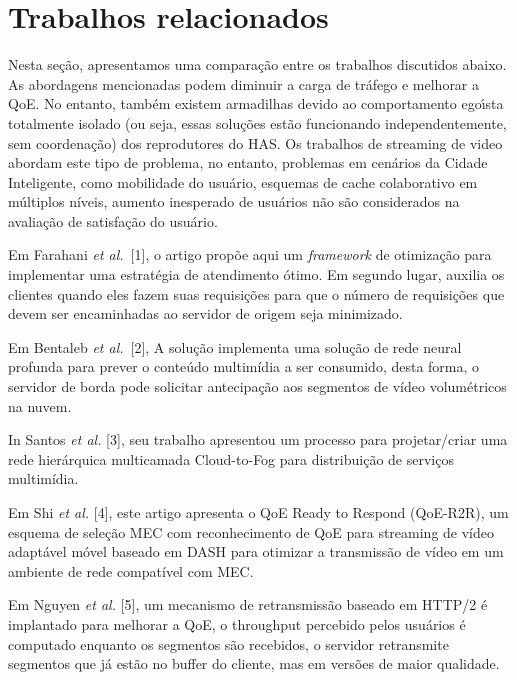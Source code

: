 \section{Trabalhos relacionados}

Nesta seção, apresentamos uma comparação entre os trabalhos discutidos abaixo.
As abordagens mencionadas podem diminuir a carga de tráfego e melhorar a QoE.
No entanto, também existem armadilhas devido ao comportamento egoı́sta totalmente isolado (ou seja, essas soluções estão funcionando independentemente, sem coordenação) dos reprodutores do HAS. Os trabalhos de streaming de video abordam este tipo de problema, no entanto, problemas em cenários da Cidade Inteligente, como mobilidade do usuário, esquemas de cache colaborativo em múltiplos níveis, aumento inesperado de usuários não são considerados na avaliação de satisfação do usuário.

Em Farahani \textit{et al.}~[1], o artigo propõe aqui um \textit{framework} de otimização para implementar uma estratégia de atendimento ótimo. Em segundo lugar, auxilia os clientes quando eles fazem suas requisições para que o número de requisições que devem ser encaminhadas ao servidor de origem seja minimizado.

Em Bentaleb \textit{et al.}~[2], A solução implementa uma solução de rede neural profunda para prever o conteúdo multimídia a ser consumido, desta forma, o servidor de borda pode solicitar antecipação aos segmentos de vídeo volumétricos na nuvem.

In Santos \textit{et al.} [3], seu trabalho apresentou um processo para projetar/criar uma rede hierárquica multicamada Cloud-to-Fog para distribuição de serviços multimídia.

Em Shi \textit{et al.} [4], este artigo apresenta o QoE Ready to Respond (QoE-R2R), um esquema de seleção MEC com reconhecimento de QoE para streaming de vídeo adaptável móvel baseado em DASH para otimizar a transmissão de vídeo em um ambiente de rede compatível com MEC.

Em Nguyen \textit{et al.} [5], um mecanismo de retransmissão baseado em HTTP/2 é implantado para melhorar a QoE, o throughput percebido pelos usuários é computado enquanto os segmentos são recebidos, o servidor retransmite segmentos que já estão no buffer do cliente, mas em versões de maior qualidade.


